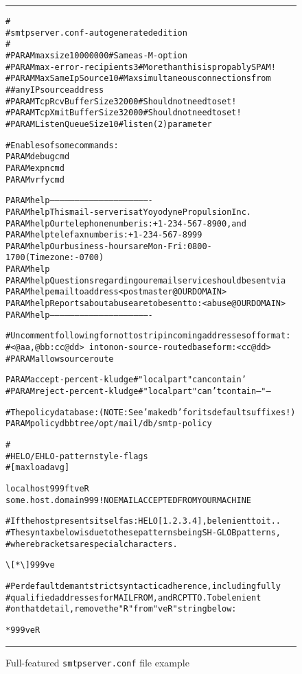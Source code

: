 \begin{figure*}
\begin{alltt}\hrule\setlength{\baselineskip}{0.8\baselineskip}\medskip
#
# {\rm{}smtpserver.conf - autogenerated edition}
#
#PARAM maxsize              10000000    # {\rm{}Same as -M -option}
#PARAM max-error-recipients        3    # {\rm{}More than this is propably SPAM!}
#PARAM MaxSameIpSource            10    # {\rm{}Max simultaneous connections from}
#                                       # {\rm{}any IP source address}
#PARAM TcpRcvBufferSize        32000    # {\rm{}Should not need to set!}
#PARAM TcpXmitBufferSize       32000    # {\rm{}Should not need to set!}
#PARAM ListenQueueSize            10    # {\rm{}listen(2) parameter}

# {\rm{}Enables of some commands:}
PARAM debugcmd
PARAM expncmd
PARAM vrfycmd

PARAM help -------------------------------------------------------------
PARAM help  This mail-server is at Yoyodyne Propulsion Inc.
PARAM help  Our telephone number is: +1-234-567-8900, and
PARAM help  telefax number is: +1-234-567-8999
PARAM help  Our business-hours are Mon-Fri: 0800-1700 (Timezone: -0700)
PARAM help
PARAM help  Questions regarding our email service should be sent via
PARAM help  email to address  <postmaster@OURDOMAIN>
PARAM help  Reports about abuse are to be sent to: <abuse@OURDOMAIN>
PARAM help -------------------------------------------------------------

# {\rm{}Uncomment following for not to strip incoming addresses of format:}
# {\rm}<{\rm{}@aa,@bb:cc@dd}>{\rm\ into non-source-routed base form: }<{\rm{}cc@dd}>
#PARAM  allowsourceroute

PARAM   accept-percent-kludge # "localpart" can contain '%' and '!'
#PARAM  reject-percent-kludge # "localpart" can't contain  --"--

# {\rm{}The policy database:  (NOTE: See  'makedb'  for its default suffixes!)}
PARAM  policydb   btree  /opt/mail/db/smtp-policy

#
# HELO/EHLO-pattern     style-flags
#               [max loadavg]

localhost           999 ftveR
some.host.domain    999 !NO EMAIL ACCEPTED FROM YOUR MACHINE

# {\rm{}If the host presents itself as:  HELO [1.2.3.4], be lenient to it..}
# {\rm{}The syntax below is due to these patterns being SH-GLOB patterns,}
# {\rm{}where brackets are special characters.}

\verb/\/[*\verb/\/]               999 ve

# {\rm{}Per default demant strict syntactic adherence, including fully}
# {\rm{}qualified addresses for  MAIL FROM, and RCPT TO.  To be lenient}
# {\rm{}on that detail, remove the "R" from "veR" string below:}

*                   999 veR
\medskip\hrule\end{alltt}
\caption{Full-featured {\tt smtpserver.conf} file example}
\label{fig:ref:smtpserver2}
\end{figure*}




